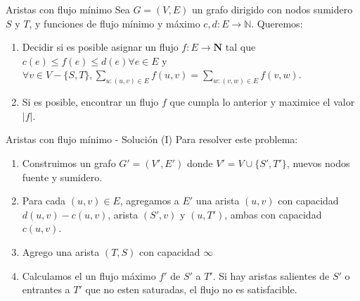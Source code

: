 \documentclass{beamer}
\begin{document}

\begin{frame}{Aristas con flujo mínimo}
    Sea $G = (V,E)$ un grafo dirigido con nodos sumidero $S$ y $T$, y funciones de flujo mínimo y máximo $c,d: E \to \mathbb{N}$.
    Queremos:
    \begin{enumerate}
        \item Decidir si es posible asignar un flujo $f: E \to \textbf{N}$ tal que $c(e) \leq f(e) \leq d(e) \forall e \in E$ y $\forall v \in V - \{S,T\}, \sum_{u: (u,v) \in E} f(u,v) = \sum_{w: (v,w) \in E} f(v,w)$.
        \item Si es posible, encontrar un flujo $f$ que cumpla lo anterior y maximice el valor $|f|$.
    \end{enumerate}
\end{frame}

\begin{frame}{Aristas con flujo mínimo - Solución (I)}
    Para resolver este problema:
    \begin{enumerate}
        \item Construimos un grafo $G' = (V', E')$ donde $V' = V \cup \{S', T'\}$, nuevos nodos fuente y sumidero.
        \pause
        \item Para cada $(u,v) \in E$, agregamos a $E'$ una arista $(u,v)$ con capacidad $d(u,v) - c(u,v)$, arista $(S',v)$ y $(u,T')$, ambas con capacidad $c(u,v)$.
        \pause
        \item Agrego una arista $(T,S)$ con capacidad $\infty$
        \item Calculamos el un flujo máximo $f'$ de $S'$ a $T'$. Si hay aristas salientes de $S'$ o entrantes a $T'$ que no esten saturadas, el flujo no es satisfacible.
        
    \end{enumerate}
\end{frame}
\end{document}

